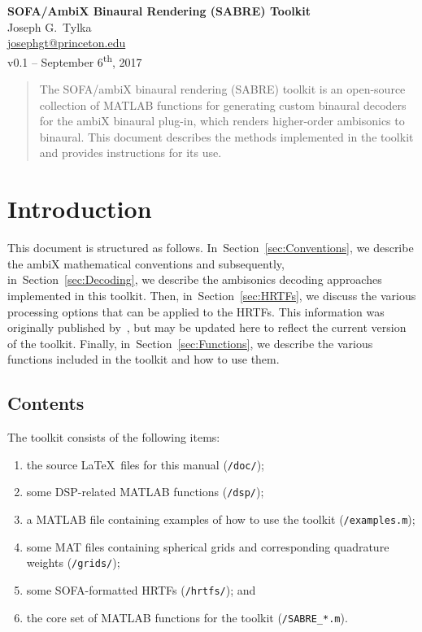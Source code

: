 \documentclass[11pt, oneside]{article}
\newcommand{\secref}[1]{Section~\ref{#1}}
\begin{document}
\begin{centering}
{\Large \textbf{SOFA/AmbiX Binaural Rendering (SABRE) Toolkit}}\\
\vspace{\baselineskip}
Joseph G.~Tylka\\
\href{mailto:josephgt@princeton.edu}{josephgt@princeton.edu}\\
\vspace{\baselineskip}
v0.1 -- September 6\textsuperscript{th}, 2017\\
\end{centering}

\begin{abstract}
The SOFA/ambiX binaural rendering (SABRE) toolkit is an open-source collection of MATLAB functions for generating custom binaural decoders for the ambiX binaural plug-in, which renders higher-order ambisonics to binaural.
This document describes the methods implemented in the toolkit and provides instructions for its use.
\end{abstract}

\section{Introduction}
This document is structured as follows.
In~\secref{sec:Conventions}, we describe the ambiX mathematical conventions and subsequently,
in~\secref{sec:Decoding}, we describe the ambisonics decoding approaches implemented in this toolkit.
Then, in~\secref{sec:HRTFs}, we discuss the various processing options that can be applied to the HRTFs.
This information was originally published by~\citet{TylkaChoueiri2017}, but may be updated here to reflect the current version of the toolkit.
Finally, in~\secref{sec:Functions}, we describe the various functions included in the toolkit and how to use them.

\subsection{Contents}
The toolkit consists of the following items:
\begin{enumerate}
\item the source \LaTeX~files for this manual (\texttt{/doc/});
\item some DSP-related MATLAB functions (\texttt{/dsp/});
\item a MATLAB file containing examples of how to use the toolkit (\texttt{/examples.m});
\item some MAT files containing spherical grids and corresponding quadrature weights (\texttt{/grids/});
\item some SOFA-formatted HRTFs (\texttt{/hrtfs/}); and
\item the core set of MATLAB functions for the toolkit (\texttt{/SABRE\_*.m}).
\end{enumerate}
\end{document}
